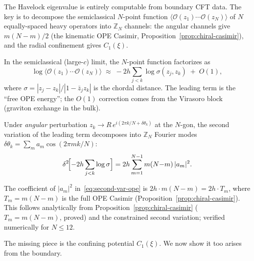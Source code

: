 The Havelock eigenvalue is entirely computable from boundary
CFT data.
The key is to decompose the semiclassical $N$-point function
$\langle\mathcal{O}(z_1)\cdots\mathcal{O}(z_N)\rangle$
of $N$ equally-spaced heavy operators into
$\mathbb{Z}_N$ channels: the angular channels give $m(N{-}m)/2$
(the kinematic OPE Casimir, Proposition~\ref{prop:chiral-casimir}),
and the radial confinement gives $C_1(\xi)$.

In the semiclassical (large-$c$) limit, the $N$-point
function factorizes as
\begin{equation}\label{eq:n-point-semiclassical}
  \log\langle\mathcal{O}(z_1)\cdots\mathcal{O}(z_N)\rangle
  \;\approx\;
  -2h \sum_{j<k} \log\sigma(z_j, z_k)
  \;+\; O(1),
\end{equation}
where $\sigma = |z_j{-}z_k|/|1{-}\bar{z}_j z_k|$ is the
chordal distance.
The leading term is the ``free OPE energy''; the $O(1)$
correction comes from the Virasoro block (graviton exchange
in the bulk).

Under \emph{angular} perturbation
$z_k \to R\,e^{i(2\pi k/N + \delta\theta_k)}$ at the $N$-gon,
the second variation of the leading term decomposes into
$\mathbb{Z}_N$ Fourier modes $\delta\theta_k =
\sum_m a_m \cos(2\pi mk/N)$:
\begin{equation}\label{eq:second-var-ope}
  \delta^2\!\Bigl[-2h\sum_{j<k}\log\sigma\Bigr]
  = 2h \sum_{m=1}^{N-1} m(N{-}m)\,|a_m|^2.
\end{equation}

\begin{proposition}
\label{prop:ope-stiffness}
The coefficient of $|a_m|^2$
in~\eqref{eq:second-var-ope} is $2h\cdot m(N{-}m)
= 2h \cdot T_m$, where $T_m = m(N{-}m)$ is the full
OPE Casimir (Proposition~\ref{prop:chiral-casimir}).
This follows analytically from
Proposition~\ref{prop:chiral-casimir}
($T_m = m(N{-}m)$, proved) and the constrained second
variation; verified numerically for $N \le 12$.
\end{proposition}

The missing piece is the confining potential $C_1(\xi)$.
We now show it too arises from the boundary.

